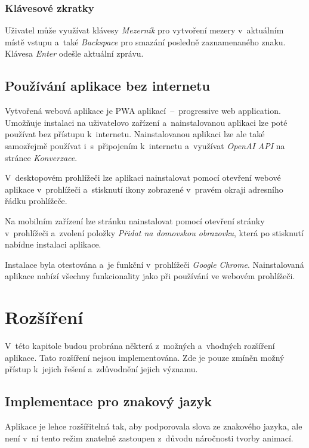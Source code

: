 \documentclass[
  master,
  program=ainfvs,
  biblatex,
  figures=true,
  tables=false,
  sourcecodes=true,
  glossaries,
  index
]{kidiplom}
\begin{document}
        \subsubsection{Klávesové zkratky}
            Uživatel může využívat klávesy \emph{Mezerník} pro vytvoření mezery v~aktuálním místě vstupu a~také \emph{Backspace} pro smazání posledně zaznamenaného znaku. Klávesa \emph{Enter} odešle aktuální zprávu.

    \subsection{Používání aplikace bez internetu}
        Vytvořená webová aplikace je PWA aplikací~--~progressive web application. Umožňuje instalaci na uživatelovo zařízení a~nainstalovanou aplikaci lze poté používat bez přístupu k~internetu. Nainstalovanou aplikaci lze ale také samozřejmě používat i~s~připojením k~internetu a~využívat \emph{OpenAI API} na stránce \emph{Konverzace}.
        
        V~desktopovém prohlížeči lze aplikaci nainstalovat pomocí otevření webové aplikace v~prohlížeči a~stisknutí ikony zobrazené v~pravém okraji adresního řádku prohlížeče.

        Na mobilním zařízení lze stránku nainstalovat pomocí otevření stránky v~prohlížeči a~zvolení položky \emph{Přidat na domovskou obrazovku}, která po stisknutí nabídne instalaci aplikace.

        Instalace byla otestována a~je funkční v~prohlížeči \emph{Google Chrome}. Nainstalovaná aplikace nabízí všechny funkcionality jako při používání ve webovém prohlížeči.

\clearpage



\section{Rozšíření}
    V~této kapitole budou probrána některá z~možných a~vhodných rozšíření aplikace. Tato rozšíření nejsou implementována. Zde je pouze zmíněn možný přístup k~jejich řešení a~zdůvodnění jejich významu.


    \subsection{Implementace pro znakový jazyk}
        Aplikace je lehce rozšířitelná tak, aby podporovala slova ze znakového jazyka, ale není v~ní tento režim znatelně zastoupen z~důvodu náročnosti tvorby animací.
            
\end{document}
